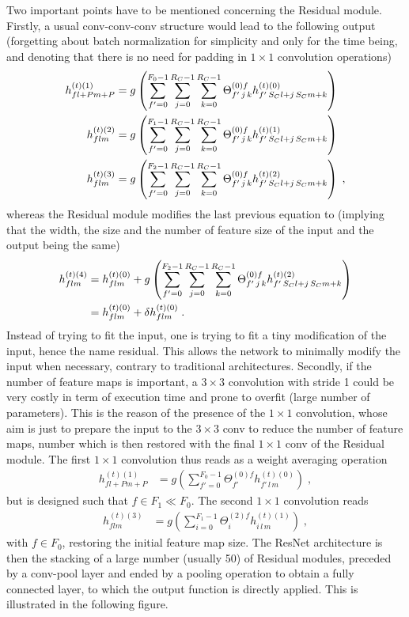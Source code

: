 \vspace{0.2cm}

Two important points have to be mentioned concerning the Residual module. Firstly, a usual conv-conv-conv structure would lead to the following output (forgetting about batch normalization for simplicity and only for the time being, and denoting that there is no need for padding in $1\times 1$ convolution operations)
\begin{align}
h^{(t)(1)}_{fl+Pm+P}&=
%
g\left(\sum^{F_0-1}_{f'=0}\sum^{R_C-1}_{j=0}\sum^{R_C-1}_{k=0}
%
\Theta^{(0)f}_{f'\,j\,k}h^{(t)(0)}_{f'\,S_Cl+j\,S_Cm+k}\right)\notag\\
%
h^{(t)(2)}_{flm}&=
%
g\left(\sum^{F_1-1}_{f'=0}\sum^{R_C-1}_{j=0}\sum^{R_C-1}_{k=0}
%
\Theta^{(0)f}_{f'\,j\,k}h^{(t)(1)}_{f'\,S_Cl+j\,S_Cm+k}\right)\notag\\
%
h^{(t)(3)}_{flm}&=
%
g\left(\sum^{F_2-1}_{f'=0}\sum^{R_C-1}_{j=0}\sum^{R_C-1}_{k=0}
%
\Theta^{(0)f}_{f'\,j\,k}h^{(t)(2)}_{f'\,S_Cl+j\,S_Cm+k}\right)\;,
\end{align}
whereas the Residual module modifies the last previous equation to (implying that the width, the size and the number of feature size of the input and the output being the same)
\begin{align}
h^{(t)(4)}_{flm}&=h^{(t)(0)}_{flm}+g\left(
%
\sum^{F_2-1}_{f'=0}\sum^{R_C-1}_{j=0}\sum^{R_C-1}_{k=0}
%
\Theta^{(0)f}_{f'\,j\,k}h^{(t)(2)}_{f'\,S_Cl+j\,S_Cm+k}\right)\notag\\
%
&=h^{(t)(0)}_{flm}+\delta h^{(t)(0)}_{flm}\;.
\end{align}
Instead of trying to fit the input, one is trying to fit a tiny modification of the input, hence the name residual. This allows the network to minimally modify the input when necessary, contrary to traditional architectures. Secondly, if the number of feature maps is important, a $3\times 3$ convolution with stride 1 could be very costly in term of execution time and prone to overfit (large number of parameters). This is the reason of the presence of the $1 \times 1$ convolution, whose aim is just to prepare the input to the $3\times 3$ conv to reduce the number of feature maps, number which is then restored with the final $1\times 1$ conv of the Residual module. The first $1\times 1$ convolution thus reads as a weight averaging operation 
\begin{align}
h^{(t)(1)}_{fl+Pm+P}&=
%
g\left(\sum^{F_0-1}_{f'=0}
%
\Theta^{(0)f}_{f'}h^{(t)(0)}_{f'\,l\,m}\right)\;,
\end{align}
but is designed such that $f\in F_1\ll F_0$. The second $1\times 1$ convolution reads
\begin{align}
h^{(t)(3)}_{flm}&=g\left(\sum^{F_1-1}_{i=0}\Theta^{(2)f}_{i}h^{(t)(1)}_{i\,l\,m}\right)\;,
\end{align}
with $f \in F_0$, restoring the initial feature map size. The ResNet architecture is then the stacking of a large number (usually 50) of Residual modules, preceded by a conv-pool layer and ended by a pooling operation to obtain a fully connected layer, to which the output function is directly applied. This is illustrated in the following figure.



